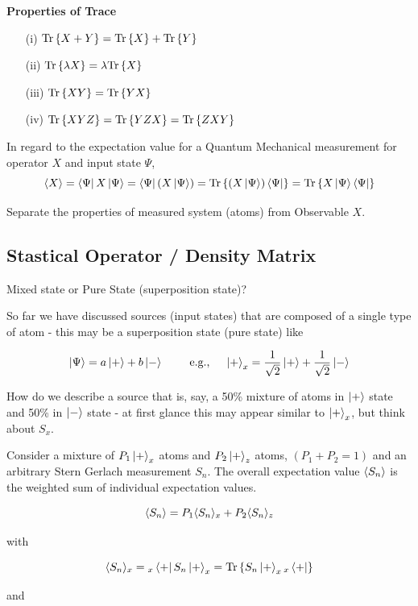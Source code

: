 \documentclass[english, 11pt]{article}
\begin{document}
      \textbf{Properties of Trace}

      \begin{itemize}
        \item[(i)] $\mbox{Tr}\left\{ X+Y \right\} = \mbox{Tr}\left\{ X \right\} + \mbox{Tr}\left\{ Y \right\}$
        \item[(ii)] $\mbox{Tr}\left\{ \lambda X \right\} = \lambda\mbox{Tr}\left\{ X \right\}$
        \item[(iii)] $\mbox{Tr}\left\{ XY \right\} = \mbox{Tr}\left\{ YX \right\}$
        \item[(iv)] $\mbox{Tr}\left\{ XYZ \right\} = \mbox{Tr}\left\{ YZX \right\} = \mbox{Tr}\left\{ ZXY \right\}$
      \end{itemize}

      In regard to the expectation value for a Quantum Mechanical measurement for operator $X$ and input state $\Psi$,
      \[ \langle X \rangle = \left\langle\Psi\right|X\left|\Psi\right\rangle = \left\langle\Psi\right|\left( X\left|\Psi\right\rangle \right) = \mbox{Tr}\left\{  \left( X\left|\Psi\right\rangle \right)\left\langle\Psi\right| \right\} = \mbox{Tr}\left\{ X\left|\Psi\right\rangle\left\langle\Psi\right| \right\}\]

      Separate the properties of measured system (atoms) from Observable $X$.

    \subsection{Stastical Operator / Density Matrix}

      Mixed state or Pure State (superposition state)?
      \newline

      So far we have discussed sources (input states) that are composed of a single type of atom - this may be a superposition state (pure state) like

      \[ \kpsi = a\kp + b\km \ \ \ \ \ \ \ \mbox{e.g., \ \ \ } \kp_x = \f{1}{\sqrt{2}}\kp + \f{1}{\sqrt{2}}\km \]

      How do we describe a source that is, say, a 50\% mixture of atoms in $\left|+\right\rangle$ state and 50\% in $\left|-\right\rangle$ state - at first glance this may appear similar to $\left|+\right\rangle_x$, but think about $S_x$. \newline

      Consider a mixture of $P_1 \left|+\right\rangle_x$ atoms and $P_2 \left|+\right\rangle_z$ atoms, $(P_1 +P_2 = 1)$ and an arbitrary Stern Gerlach measurement $S_n$. The overall expectation value $\langle S_n \rangle$ is the weighted sum of individual expectation values.

      \[ \langle S_n \rangle = P_1 \langle S_n \rangle_x + P_2\langle S_n \rangle_z \]

      with

      \[ \langle S_n \rangle_x = {}_x\left\langle+\right| S_n\left|+\right\rangle_x = \mbox{Tr}\left\{ S_n\left|+\right\rangle_x {}_x\left\langle+\right| \right\} \]

      and
\end{document}
